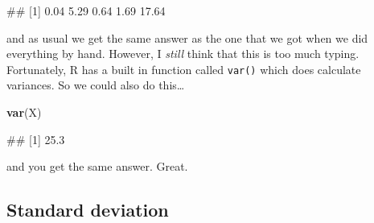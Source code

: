 \documentclass[
]{book}
\newenvironment{Shaded}{\begin{snugshade}}{\end{snugshade}}
\newcommand{\DecValTok}[1]{\textcolor[rgb]{0.00,0.00,0.81}{#1}}
\newcommand{\FunctionTok}[1]{\textcolor[rgb]{0.13,0.29,0.53}{\textbf{#1}}}
\newcommand{\NormalTok}[1]{#1}
\newcommand{\OtherTok}[1]{\textcolor[rgb]{0.56,0.35,0.01}{#1}}
\newcommand{\SpecialCharTok}[1]{\textcolor[rgb]{0.81,0.36,0.00}{\textbf{#1}}}
\begin{document}
\begin{Shaded}
\end{Shaded}

\begin{Shaded}
\begin{Highlighting}[]
\NormalTok{\#\# [1]  0.04  5.29  0.64  1.69 17.64}
\end{Highlighting}
\end{Shaded}

and as usual we get the same answer as the one that we got when we did everything by hand. However, I \emph{still} think that this is too much typing. Fortunately, R has a built in function called \texttt{var()} which does calculate variances. So we could also do this\ldots{}

\begin{Shaded}
\begin{Highlighting}[]
\FunctionTok{var}\NormalTok{(X)}
\end{Highlighting}
\end{Shaded}

\begin{Shaded}
\begin{Highlighting}[]
\NormalTok{\#\# [1] 25.3}
\end{Highlighting}
\end{Shaded}

and you get the same answer. Great.

\subsection{Standard deviation}\label{sd}
\end{document}
